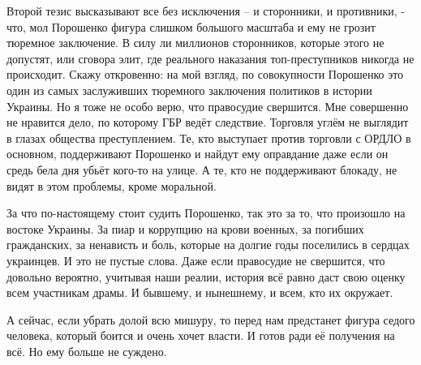 Второй тезис высказывают все без исключения – и сторонники, и противники, -
что, мол Порошенко фигура слишком большого масштаба и ему не грозит тюремное
заключение. В силу ли миллионов сторонников, которые этого не допустят, или
сговора элит, где реального наказания топ-преступников никогда не происходит.
Скажу откровенно: на мой взгляд, по совокупности Порошенко это один из самых
заслуживших тюремного заключения политиков в истории Украины. Но я тоже не
особо верю, что правосудие свершится. Мне совершенно не нравится дело, по
которому ГБР ведёт следствие. Торговля углём не выглядит в глазах общества
преступлением. Те, кто выступает против торговли с ОРДЛО в основном,
поддерживают Порошенко и найдут ему оправдание даже если он средь бела дня
убьёт кого-то на улице. А те, кто не поддерживают блокаду, не видят в этом
проблемы, кроме моральной.

За что по-настоящему стоит судить Порошенко, так это за то, что произошло на
востоке Украины. За пиар и коррупцию на крови военных, за погибших гражданских,
за ненависть и боль, которые на долгие годы поселились в сердцах украинцев. И
это не пустые слова. Даже если правосудие не свершится, что довольно вероятно,
учитывая наши реалии, история всё равно даст свою оценку всем участникам драмы.
И бывшему, и нынешнему, и всем, кто их окружает.

А сейчас, если убрать долой всю мишуру, то перед нам предстанет фигура седого
человека, который боится и очень хочет власти. И готов ради её получения на
всё. Но ему больше не суждено.

